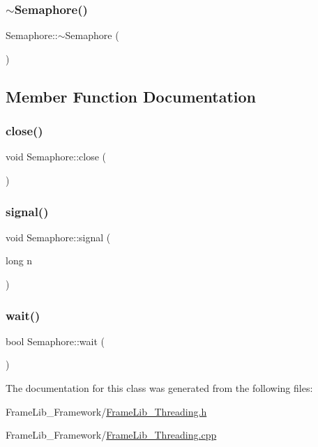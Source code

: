 \subsubsection{\texorpdfstring{$\sim$\+Semaphore()}{~Semaphore()}}
{\footnotesize\ttfamily Semaphore\+::$\sim$\+Semaphore (\begin{DoxyParamCaption}{ }\end{DoxyParamCaption})}



\subsection{Member Function Documentation}
\mbox{\label{class_semaphore_ab04c0934fbf281eb49bd332ecd07c856}} 
\subsubsection{\texorpdfstring{close()}{close()}}
{\footnotesize\ttfamily void Semaphore\+::close (\begin{DoxyParamCaption}{ }\end{DoxyParamCaption})}

\mbox{\label{class_semaphore_adcd7d652d882d0ab4b068070235ef079}} 
\subsubsection{\texorpdfstring{signal()}{signal()}}
{\footnotesize\ttfamily void Semaphore\+::signal (\begin{DoxyParamCaption}\item[{long}]{n }\end{DoxyParamCaption})}

\mbox{\label{class_semaphore_a496aae0d0eceef9385c9dcae4c3d9b36}} 
\subsubsection{\texorpdfstring{wait()}{wait()}}
{\footnotesize\ttfamily bool Semaphore\+::wait (\begin{DoxyParamCaption}{ }\end{DoxyParamCaption})}



The documentation for this class was generated from the following files\+:\begin{DoxyCompactItemize}
\item 
Frame\+Lib\+\_\+\+Framework/\hyperlink{_frame_lib___threading_8h}{Frame\+Lib\+\_\+\+Threading.\+h}\item 
Frame\+Lib\+\_\+\+Framework/\hyperlink{_frame_lib___threading_8cpp}{Frame\+Lib\+\_\+\+Threading.\+cpp}\end{DoxyCompactItemize}
